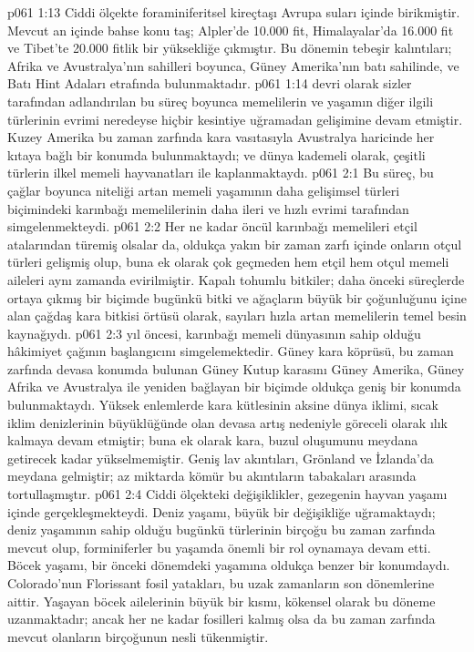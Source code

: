 \vs p061 1:13 Ciddi ölçekte foraminiferitsel kireçtaşı Avrupa suları içinde birikmiştir. Mevcut an içinde bahse konu taş; Alpler’de 10.000 fit, Himalayalar’da 16.000 fit ve Tibet’te 20.000 fitlik bir yüksekliğe çıkmıştır. Bu dönemin tebeşir kalıntıları; Afrika ve Avustralya’nın sahilleri boyunca, Güney Amerika’nın batı sahilinde, ve Batı Hint Adaları etrafında bulunmaktadır.
\vs p061 1:14 devri olarak sizler tarafından adlandırılan bu süreç boyunca memelilerin ve yaşamın diğer ilgili türlerinin evrimi neredeyse hiçbir kesintiye uğramadan gelişimine devam etmiştir. Kuzey Amerika bu zaman zarfında kara vasıtasıyla Avustralya haricinde her kıtaya bağlı bir konumda bulunmaktaydı; ve dünya kademeli olarak, çeşitli türlerin ilkel memeli hayvanatları ile kaplanmaktaydı.
\vs p061 2:1 Bu süreç, bu çağlar boyunca niteliği artan memeli yaşamının daha gelişimsel türleri biçimindeki karınbağı memelilerinin daha ileri ve hızlı evrimi tarafından simgelenmekteydi.
\vs p061 2:2 Her ne kadar öncül karınbağı memelileri etçil atalarından türemiş olsalar da, oldukça yakın bir zaman zarfı içinde onların otçul türleri gelişmiş olup, buna ek olarak çok geçmeden hem etçil hem otçul memeli aileleri aynı zamanda evirilmiştir. Kapalı tohumlu bitkiler; daha önceki süreçlerde ortaya çıkmış bir biçimde bugünkü bitki ve ağaçların büyük bir çoğunluğunu içine alan çağdaş kara bitkisi örtüsü olarak, sayıları hızla artan memelilerin temel besin kaynağıydı.
\vs p061 2:3  yıl öncesi, karınbağı memeli dünyasının sahip olduğu hâkimiyet çağının başlangıcını simgelemektedir. Güney kara köprüsü, bu zaman zarfında devasa konumda bulunan Güney Kutup karasını Güney Amerika, Güney Afrika ve Avustralya ile yeniden bağlayan bir biçimde oldukça geniş bir konumda bulunmaktaydı. Yüksek enlemlerde kara kütlesinin aksine dünya iklimi, sıcak iklim denizlerinin büyüklüğünde olan devasa artış nedeniyle göreceli olarak ılık kalmaya devam etmiştir; buna ek olarak kara, buzul oluşumunu meydana getirecek kadar yükselmemiştir. Geniş lav akıntıları, Grönland ve İzlanda’da meydana gelmiştir; az miktarda kömür bu akıntıların tabakaları arasında tortullaşmıştır.
\vs p061 2:4 Ciddi ölçekteki değişiklikler, gezegenin hayvan yaşamı içinde gerçekleşmekteydi. Deniz yaşamı, büyük bir değişikliğe uğramaktaydı; deniz yaşamının sahip olduğu bugünkü türlerinin birçoğu bu zaman zarfında mevcut olup, forminiferler bu yaşamda önemli bir rol oynamaya devam etti. Böcek yaşamı, bir önceki dönemdeki yaşamına oldukça benzer bir konumdaydı. Colorado’nun Florissant fosil yatakları, bu uzak zamanların son dönemlerine aittir. Yaşayan böcek ailelerinin büyük bir kısmı, kökensel olarak bu döneme uzanmaktadır; ancak her ne kadar fosilleri kalmış olsa da bu zaman zarfında mevcut olanların birçoğunun nesli tükenmiştir.
